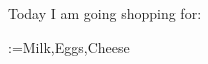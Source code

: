 \def\items{Milk,Eggs,Cheese}

Today I am going shopping for:

\begin{enumerate}
  \makeatletter
  \@for\itm:=\items\do{
    \item \itm
  }
\end{enumerate}